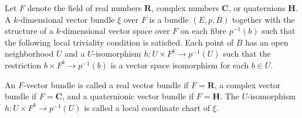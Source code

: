 Let $F$ denote the field of real numbers $\mathbf{R}$, complex numbers $\mathbf{C}$, or quaternions $\mathbf{H}$. A $k$-dimensional vector bundle $\xi$ over $F$ is a bundle $(E, p, B)$ together with the structure of a $k$-dimensional vector space over $F$ on each fibre $p^{-1}(b)$ such that the following local triviality condition is satisfied. Each point of $B$ has an open neighborhood $U$ and a $U$-isomorphism $h: U \times F^k \to p^{-1}(U)$ such that the restriction $b \times F^k \to p^{-1}(b)$ is a vector space isomorphism for each $b \in U$.

An $F$-vector bundle is called a real vector bundle if $F = \mathbf{R}$, a complex vector bundle if $F = \mathbf{C}$, and a quaternionic vector bundle if $F = \mathbf{H}$. The $U$-isomorphism $h: U \times F^k \to p^{-1}(U)$ is called a local coordinate chart of $\xi$.
